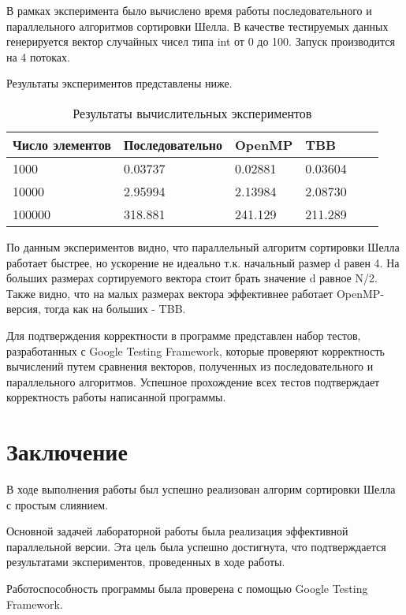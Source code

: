 \documentclass{report}
\begin{document}
В рамках эксперимента было вычислено время работы последовательного и параллельного алгоритмов сортировки Шелла.
В качестве тестируемых данных генерируется вектор случайных чисел типа int от 0 до 100. Запуск производится на 4 потоках.

Результаты экспериментов представлены ниже.
\begin{table}[!h]
\centering
\begin{tabular}{ | l | l | l | l  | l | l | }
\hline
Число элементов  & Последовательно & OpenMP & TBB  \\ \hline
1000  & 0.03737 & 0.02881 &  0.03604 \\ \hline
10000  & 2.95994 & 2.13984 &  2.08730 \\ \hline
100000  & 318.881 & 241.129 &  211.289 \\ \hline
\end{tabular}
\caption{Результаты вычислительных экспериментов}
\end{table}

По данным экспериментов видно, что параллельный алгоритм сортировки Шелла работает быстрее, но ускорение не идеально т.к. начальный размер d равен 4. На больших размерах сортируемого вектора стоит брать значение d равное N/2. Также видно, что на малых размерах вектора эффективнее работает OpenMP-версия, тогда как на больших - TBB.

Для подтверждения корректности в программе представлен набор тестов, разработанных с Google Testing Framework, которые проверяют корректность вычислений путем сравнения векторов, полученных из последовательного и параллельного алгоритмов. Успешное прохождение всех тестов подтверждает корректность работы написанной программы.

\newpage

\section*{Заключение}
В ходе выполнения работы был успешно реализован алгорим сортировки Шелла с простым слиянием.

Основной задачей лабораторной работы была реализация эффективной параллельной версии. Эта цель была успешно достигнута, что подтверждается результатами экспериментов, проведенных в ходе работы.

Работоспособность программы была проверена с помощью Google Testing Framework.

\newpage
\end{document}
